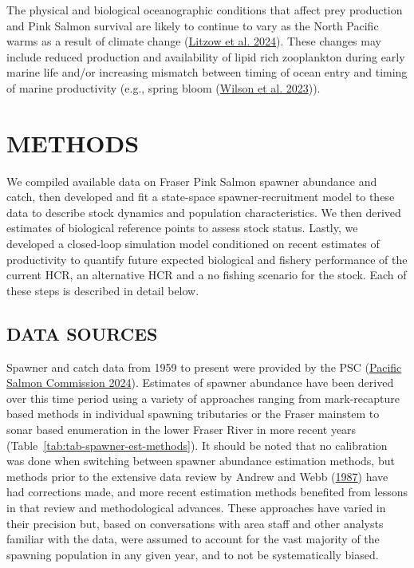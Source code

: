 \documentclass[11pt]{book}
\begin{document}
The physical and biological oceanographic conditions that affect prey production and Pink Salmon survival are likely to continue to vary as the North Pacific warms as a result of climate change (\protect\hyperlink{ref-litzowClimateAttributionTime2024}{Litzow et al. 2024}). These changes may include reduced production and availability of lipid rich zooplankton during early marine life and/or increasing mismatch between timing of ocean entry and timing of marine productivity (e.g., spring bloom (\protect\hyperlink{ref-wilsonPhenologicalShiftsMismatch2023}{Wilson et al. 2023})).

\hypertarget{methods}{%
\section{METHODS}\label{methods}}

We compiled available data on Fraser Pink Salmon spawner abundance and catch, then developed and fit a state-space spawner-recruitment model to these data to describe stock dynamics and population characteristics. We then derived estimates of biological reference points to assess stock status. Lastly, we developed a closed-loop simulation model conditioned on recent estimates of productivity to quantify future expected biological and fishery performance of the current HCR, an alternative HCR and a no fishing scenario for the stock. Each of these steps is described in detail below.

\hypertarget{data-sources}{%
\subsection{DATA SOURCES}\label{data-sources}}

Spawner and catch data from 1959 to present were provided by the PSC (\protect\hyperlink{ref-pacificsalmoncommissionFraserRiverPanel2024}{Pacific Salmon Commission 2024}). Estimates of spawner abundance have been derived over this time period using a variety of approaches ranging from mark-recapture based methods in individual spawning tributaries or the Fraser mainstem to sonar based enumeration in the lower Fraser River in more recent years (Table~\ref{tab:tab-spawner-est-methods}). It should be noted that no calibration was done when switching between spawner abundance estimation methods, but methods prior to the extensive data review by Andrew and Webb (\protect\hyperlink{ref-andrewReviewAssessmentAdult1987}{1987}) have had corrections made, and more recent estimation methods benefited from lessons in that review and methodological advances. These approaches have varied in their precision but, based on conversations with area staff and other analysts familiar with the data, were assumed to account for the vast majority of the spawning population in any given year, and to not be systematically biased.
\end{document}
